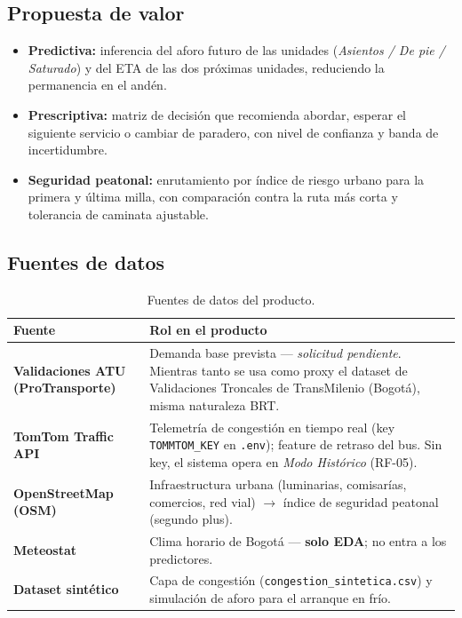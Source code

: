 \documentclass[11pt]{article}
\newcommand{\code}[1]{\texttt{#1}}
\begin{document}
\subsection{Propuesta de valor}
\begin{itemize}
  \item \textbf{Predictiva:} inferencia del aforo futuro de las unidades ({\normalfont\emph{Asientos /
        De pie / Saturado}}) y del ETA de las dos próximas unidades, reduciendo la permanencia en el andén.
  \item \textbf{Prescriptiva:} matriz de decisión que recomienda abordar, esperar el siguiente servicio
        o cambiar de paradero, con nivel de confianza y banda de incertidumbre.
  \item \textbf{Seguridad peatonal:} enrutamiento por índice de riesgo urbano para la primera y última
        milla, con comparación contra la ruta más corta y tolerancia de caminata ajustable.
\end{itemize}

\subsection{Fuentes de datos}
\begin{table}[H]
\centering
\caption{Fuentes de datos del producto.}
\label{tab:fuentes}
\begin{tabularx}{\textwidth}{l>{\raggedright\arraybackslash}X}
\toprule
\textbf{Fuente} & \textbf{Rol en el producto} \\
\midrule
\textbf{Validaciones ATU (ProTransporte)} & Demanda base prevista --- \emph{solicitud pendiente}.
Mientras tanto se usa como proxy el dataset de Validaciones Troncales de TransMilenio (Bogotá),
misma naturaleza BRT. \\
\textbf{TomTom Traffic API} & Telemetría de congestión en tiempo real (key \code{TOMMTOM\_KEY} en
\code{.env}); feature de retraso del bus. Sin key, el sistema opera en \emph{Modo Histórico} (RF-05). \\
\textbf{OpenStreetMap (OSM)} & Infraestructura urbana (luminarias, comisarías, comercios, red vial)
$\rightarrow$ índice de seguridad peatonal (segundo plus). \\
\textbf{Meteostat} & Clima horario de Bogotá --- \textbf{solo EDA}; no entra a los predictores. \\
\textbf{Dataset sintético} & Capa de congestión (\code{congestion\_sintetica.csv}) y simulación de
aforo para el arranque en frío. \\
\bottomrule
\end{tabularx}
\end{table}
\end{document}
